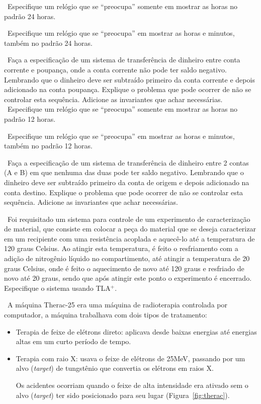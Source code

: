 ~Especifique um relógio que se ``preocupa'' somente em
mostrar as horas no padrão 24 horas.

~Especifique um relógio que se ``preocupa'' em mostrar as horas e
minutos, também no padrão 24 horas.

~Faça a especificação de um sistema de transferência de dinheiro
entre conta corrente e poupança, onde a conta corrente não pode ter saldo negativo. Lembrando
que o dinheiro deve ser subtraído primeiro da conta corrente e depois adicionado
na conta poupança. Explique o problema que pode ocorrer de não se controlar esta
sequência. Adicione as invariantes que achar necessárias.
\exercise~Especifique um relógio que se ``preocupa'' somente em mostrar as
horas no padrão 12 horas.

\exercise~Especifique um relógio que se ``preocupa'' em mostrar as horas e
minutos, também no padrão 12 horas.

\exercise~Faça a especificação de um sistema de transferência de dinheiro
entre 2 contas (A e B) em que nenhuma das duas pode ter saldo negativo. Lembrando
que o dinheiro deve ser subtraído primeiro da conta de origem e depois adicionado
na conta destino. Explique o problema que pode ocorrer de não se controlar esta
sequência. Adicione as invariantes que achar necessárias. 

\exercise~Foi requisitado um sistema para controle de um experimento
de caracterização de material, que consiste em colocar a peça do
material que se deseja caracterizar em um recipiente com uma
resistência acoplada e aquecê-lo até a temperatura de 120 graus
Celsius. Ao atingir esta temperatura, é feito o resfriamento com a
adição de nitrogênio líquido no compartimento, até atingir a
temperatura de 20 graus Celsius, onde é feito o aquecimento de novo
até 120 graus e resfriado de novo até 20 graus, sendo que após atingir
este ponto o experimento é encerrado. Especifique o sistema usando
TLA$^+$.

\exercise~A máquina Therac-25 era uma máquina de radioterapia
controlada por computador, a máquina trabalhava com dois tipos de
tratamento:

\begin{itemize}
\item Terapia de feixe de elétrons direto: aplicava desde baixas energias
 até energias altas em um curto período de tempo.

\item Terapia com raio X: usava o feixe de elétrons de 25MeV, passando
por um alvo ({\em target}) de tungstênio que convertia os elétrons em
raios X.

Os acidentes ocorriam quando o feixe de alta intensidade era ativado
sem o alvo ({\em target}) ter sido posicionado para seu lugar
(Figura~\ref{fig:therac}).
\end{itemize}

